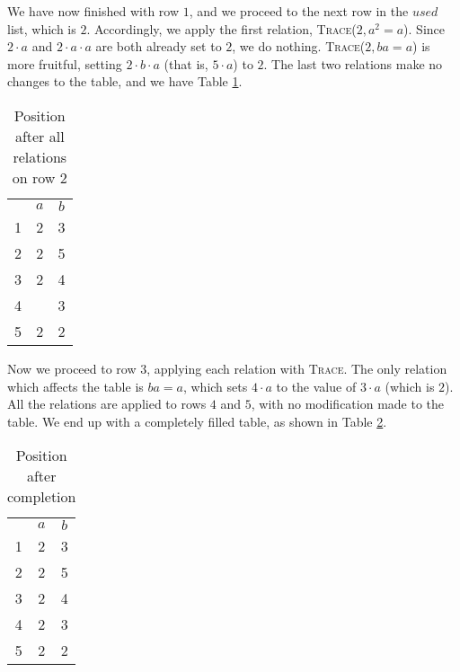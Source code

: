 We have now finished with row $1$, and we proceed to the next row in the $used$
list, which is $2$.  Accordingly, we apply the first relation,
\textsc{Trace}($2, a^2=a$).  Since $2 \cdot a$ and $2 \cdot a \cdot a$ are both
already set to $2$, we do nothing.  \textsc{Trace}($2, ba=a$) is more fruitful,
setting $2 \cdot b \cdot a$ (that is, $5 \cdot a$) to $2$.  The last two
relations make no changes to the table, and we have Table \ref{tab:tc6}.
\begin{table}[H]
  \centering
  \begin{tabular}{c | c | c |}
    \multicolumn{1}{c}{} &
    \multicolumn{1}{c}{$a$} &
    \multicolumn{1}{c}{$b$} \\
    \cline{2-3}
    1 & 2 & 3 \\
    \cline{2-3}
    2 & 2 & 5 \\
    \cline{2-3}
    3 & 2 & 4 \\
    \cline{2-3}
    4 &  & 3 \\
    \cline{2-3}
    5 & 2 & 2 \\
    \cline{2-3}
  \end{tabular}
  \caption{Position after all relations on row $2$}
  \label{tab:tc6}
\end{table}

Now we proceed to row $3$, applying each relation with \textsc{Trace}.  The only
relation which affects the table is $ba=a$,
which sets $4 \cdot a$ to the value of $3 \cdot a$ (which is $2$).
All the relations are applied to rows $4$ and $5$, with no modification made to
the table.  We end up with a completely filled table, as shown in Table
\ref{tab:tc7}.
\begin{table}[H]
  \centering
  \begin{tabular}{c | c | c |}
    \multicolumn{1}{c}{} &
    \multicolumn{1}{c}{$a$} &
    \multicolumn{1}{c}{$b$} \\
    \cline{2-3}
    1 & 2 & 3 \\
    \cline{2-3}
    2 & 2 & 5 \\
    \cline{2-3}
    3 & 2 & 4 \\
    \cline{2-3}
    4 & 2 & 3 \\
    \cline{2-3}
    5 & 2 & 2 \\
    \cline{2-3}
  \end{tabular}
  \caption{Position after completion}
  \label{tab:tc7}
\end{table}

